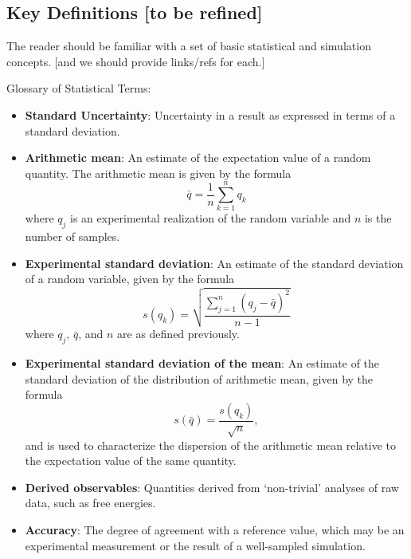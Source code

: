\subsection{Key Definitions [to be refined]}
The reader should be familiar with a set of basic statistical and simulation concepts.
[and we should provide links/refs for each.]

\cite{JCGM:GUM2008,JCGM:VIM2012}

Glossary of Statistical Terms:
\begin{itemize}
\item {\bf Standard Uncertainty}: Uncertainty in a result as expressed in terms of a standard deviation.

\item {\bf Arithmetic mean}: An estimate of the expectation value of a random quantity. The arithmetic mean is given by the formula
  \begin{equation}
    \bar{q} = \dfrac{1}{n} \sum_{k=1}^{n} q_k
  \end{equation}
  where $q_j$ is an experimental realization of the random variable and $n$ is the number of samples.
\item {\bf Experimental standard deviation}: An estimate of the standard deviation of a random variable, given by the formula
  \begin{equation}
    s\left(q_k\right) = \sqrt{\dfrac{\sum_{j=1}^n\left(q_j - \bar{q}\right)^2}{n-1}}
  \end{equation}
  where $q_j$, $\bar{q}$, and $n$ are as defined previously.
\item {\bf Experimental standard deviation of the mean}: An estimate of the standard deviation of the distribution of arithmetic mean, given by the formula
  \begin{equation}
    s\left(\bar{q}\right) = \dfrac{s\left(q_k\right)}{\sqrt{n}},
  \end{equation}
  and is used to characterize the dispersion of the arithmetic mean relative to the expectation value of the same quantity.


\item {\bf Derived observables}: Quantities derived from `non-trivial' analyses of raw data, such as free energies.

\item {\bf Accuracy}: The degree of agreement with a reference value, which may be an experimental measurement or the result of a well-sampled simulation.


\end{itemize}
